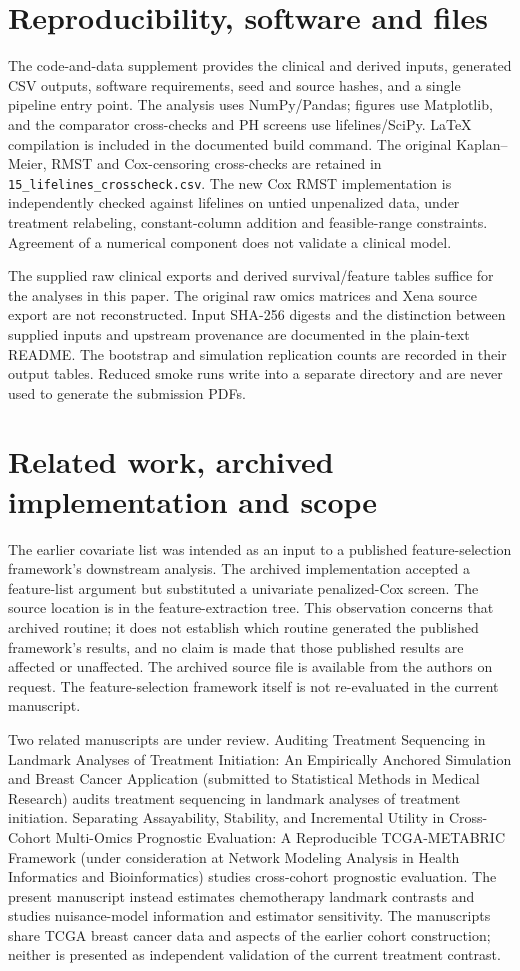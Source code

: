 \documentclass[12pt,letterpaper]{article}
\begin{document}
\section{Reproducibility, software and files}
The code-and-data supplement provides the clinical and derived inputs, generated CSV outputs, software
requirements, seed and source hashes, and a single pipeline entry point. The analysis uses NumPy/Pandas;
figures use Matplotlib, and the comparator cross-checks and PH screens use lifelines/SciPy. LaTeX compilation
is included in the documented build command. The original Kaplan--Meier, RMST and Cox-censoring cross-checks
are retained in \texttt{15\_lifelines\_crosscheck.csv}. The new Cox RMST implementation is independently
checked against lifelines on untied unpenalized data, under treatment relabeling, constant-column addition
and feasible-range constraints. Agreement of a numerical component does not validate a clinical model.

The supplied raw clinical exports and derived survival/feature tables suffice for the analyses in this paper.
The original raw omics matrices and Xena source export are not reconstructed. Input SHA-256 digests and
the distinction between supplied inputs and upstream provenance are documented in the plain-text README.
The bootstrap and simulation replication counts are recorded in their output tables. Reduced smoke runs
write into a separate directory and are never used to generate the submission PDFs.

\section{Related work, archived implementation and scope}
The earlier covariate list was intended as an input to a published feature-selection framework's downstream
analysis. The archived implementation accepted a feature-list argument but substituted a univariate
penalized-Cox screen. The source location is in the feature-extraction tree. This observation concerns that
archived routine; it does not establish which routine generated the published framework's results, and
no claim is made that those published results are affected or unaffected. The archived source file is
available from the authors on request. The feature-selection framework itself
is not re-evaluated in the current manuscript.

Two related manuscripts are under review. Auditing Treatment Sequencing in Landmark Analyses of Treatment Initiation: An Empirically Anchored Simulation and Breast Cancer Application (submitted to Statistical Methods in Medical Research) audits treatment sequencing in landmark analyses of treatment initiation. Separating Assayability, Stability, and Incremental Utility in Cross-Cohort Multi-Omics Prognostic Evaluation: A Reproducible TCGA-METABRIC Framework (under consideration at Network Modeling Analysis in Health Informatics and Bioinformatics) studies cross-cohort prognostic evaluation. The present manuscript instead estimates chemotherapy landmark contrasts and studies nuisance-model information and estimator sensitivity. The manuscripts share TCGA breast cancer data and aspects of the earlier cohort construction; neither is presented as independent validation of the current treatment contrast.
\end{document}
